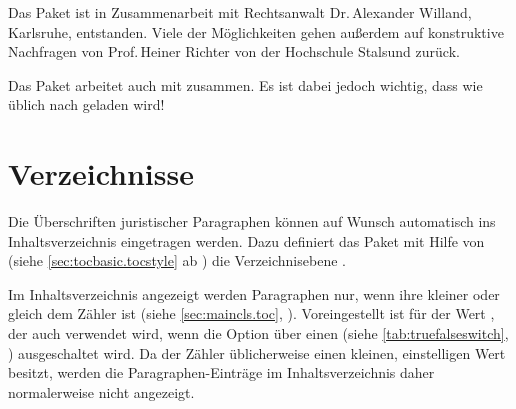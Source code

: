 Das Paket ist in Zusammenarbeit mit Rechtsanwalt Dr.\,Alexander Willand,
Karlsruhe, entstanden. Viele der Möglichkeiten gehen außerdem auf konstruktive
Nachfragen von Prof.\,Heiner Richter von der Hochschule Stalsund zurück.

\iffalse %
Es ist zu beachten, dass das Paket mit
\Package{hyperref}\IndexPackage{hyperref}\important{\Package{hyperref}}
zusammenarbeitet. %
\else%
Das Paket arbeitet auch mit
zusammen. %
\fi%
Es ist dabei jedoch wichtig, dass  wie üblich nach
 geladen wird!



\section{Verzeichnisse}
\label{sec:scrjura.toc}

Die Überschriften juristischer Paragraphen können auf Wunsch automatisch
ins Inhaltsverzeichnis eingetragen
werden. Dazu definiert das Paket mit Hilfe
von  (siehe
\autoref{sec:tocbasic.tocstyle} ab
)
die Verzeichnisebene .

\begin{Declaration}
\end{Declaration}
Im Inhaltsverzeichnis angezeigt werden
Paragraphen nur, wenn ihre 
kleiner oder gleich dem Zähler %
 ist
(siehe \autoref{sec:maincls.toc},
). Voreingestellt
ist für  der Wert , der auch verwendet
wird, wenn die Option über einen
 (siehe
\autoref{tab:truefalseswitch}, )
ausgeschaltet wird. Da der Zähler 
üblicherweise einen kleinen, einstelligen Wert besitzt, werden die
Paragraphen-Einträge im Inhaltsverzeichnis daher normalerweise nicht
angezeigt.

